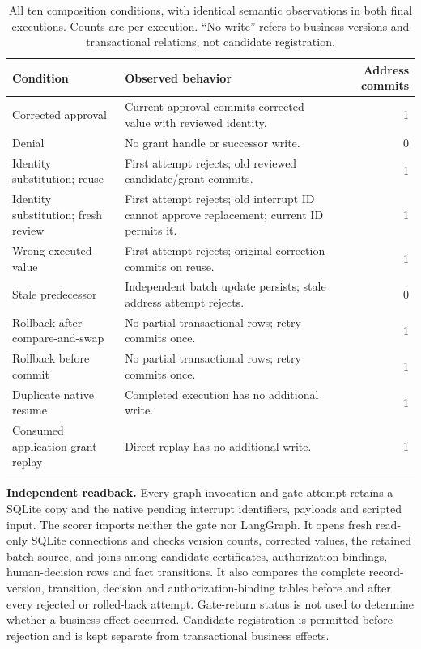 \begin{table}[htbp]
\centering\small
\caption{All ten composition conditions, with identical semantic observations in both final executions. Counts are per execution. ``No write'' refers to business versions and transactional relations, not candidate registration.}
\begin{tabularx}{\textwidth}{@{}>{\raggedright\arraybackslash}p{}Xr@{}}
\toprule
Condition & Observed behavior & Address commits\\
\midrule
Corrected approval & Current approval commits corrected value with reviewed identity. & 1\\
Denial & No grant handle or successor write. & 0\\
Identity substitution; reuse & First attempt rejects; old reviewed candidate/grant commits. & 1\\
Identity substitution; fresh review & First attempt rejects; old interrupt ID cannot approve replacement; current ID permits it. & 1\\
Wrong executed value & First attempt rejects; original correction commits on reuse. & 1\\
Stale predecessor & Independent batch update persists; stale address attempt rejects. & 0\\
Rollback after compare-and-swap & No partial transactional rows; retry commits once. & 1\\
Rollback before commit & No partial transactional rows; retry commits once. & 1\\
Duplicate native resume & Completed execution has no additional write. & 1\\
Consumed application-grant replay & Direct replay has no additional write. & 1\\
\bottomrule
\end{tabularx}
\end{table}

\textbf{Independent readback.}
Every graph invocation and gate attempt retains a SQLite copy and the native
pending interrupt identifiers, payloads and scripted input. The scorer
imports neither the gate nor LangGraph. It opens fresh read-only SQLite
connections and checks version counts, corrected values, the retained batch
source, and joins among candidate certificates, authorization bindings,
human-decision rows and fact transitions. It also compares the complete
record-version, transition, decision and authorization-binding tables before
and after every rejected or rolled-back attempt. Gate-return status is not
used to determine whether a business effect occurred. Candidate registration
is permitted before rejection and is kept separate from transactional
business effects.

